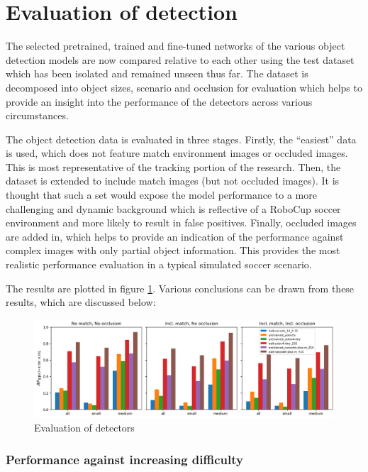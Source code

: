 \documentclass[a4paper,twoside,12pt]{report}
\begin{document}
\section{Evaluation of detection}

The selected pretrained, trained and fine-tuned networks of the various object detection models are now compared relative to each other using the test dataset which has been isolated and remained unseen thus far. The dataset is decomposed into object sizes, scenario and occlusion for evaluation which helps to provide an insight into the performance of the detectors across various circumstances. 

The object detection data is evaluated in three stages. Firstly, the ``easiest'' data is used, which does not feature match environment images or occluded images. This is most representative of the tracking portion of the research. Then, the dataset is extended to include match images (but not occluded images). It is thought that such a set would expose the model performance to a more challenging and dynamic background which is reflective of a RoboCup soccer environment and more likely to result in false positives. Finally, occluded images are added in, which helps to provide an indication of the performance against complex images with only partial object information. This provides the most realistic performance evaluation in a typical simulated soccer scenario. 

The results are plotted in figure \ref{fig:evaldetect}. Various conclusions can be drawn from these results, which are discussed below:

\begin{figure}[h!]
\begin{center}
\includegraphics[width=15.5cm]{images/eval_detect.png}
\caption{Evaluation of detectors}
\label{fig:evaldetect}
\end{center}
\end{figure}

\subsubsection{Performance against increasing difficulty}
\end{document}
